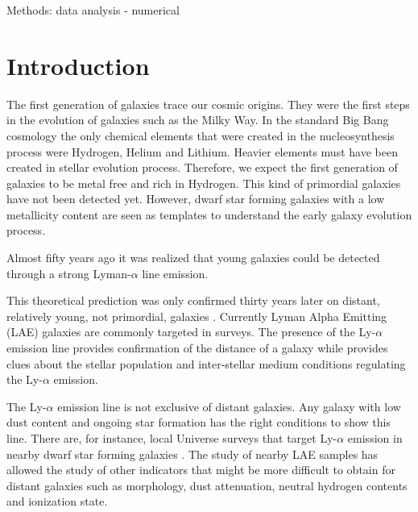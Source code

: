 \documentclass[a4,useAMS,usenatbib,usegraphicx]{mn2e}
\begin{document}
\begin{keywords}
Methods: data analysis - numerical 
\end{keywords}



\section{Introduction}
\label{sec:introduction}





The first generation of galaxies trace our cosmic origins. 
They were the first steps in the evolution of galaxies such as the Milky
Way. 
In the standard Big Bang cosmology the only chemical elements that
were created in the nucleosynthesis process were Hydrogen, Helium and
Lithium.  
Heavier elements must have been created in stellar evolution process. 
Therefore, we expect the first generation of
galaxies to be metal free and rich in Hydrogen. 
This kind of primordial galaxies have not been detected yet. 
However, dwarf star forming galaxies with a low metallicity content
are seen as templates to understand the early galaxy evolution process. 

Almost fifty years ago \citep{PartridgePeebles} it was realized that
young galaxies could be detected through a strong Lyman-$\alpha$ line
emission.  


This theoretical prediction was only confirmed thirty years later on
distant, relatively young, not primordial, galaxies \citep{1998ApJ...498L..93D}.
Currently Lyman Alpha Emitting (LAE) galaxies are commonly targeted
in surveys. 
The presence of the Ly-$\alpha$ emission line provides confirmation of
the distance of a galaxy while provides clues about the stellar
population and inter-stellar medium conditions regulating the
Ly-$\alpha$ emission. 

The Ly-$\alpha$ emission line is not exclusive of distant galaxies. 
Any galaxy with low dust content and ongoing star formation has the
right conditions to show this line.  
There are, for instance,  local Universe surveys that target
Ly-$\alpha$ emission in nearby dwarf star forming galaxies 
\citep{LARS}. 
The study of nearby LAE samples has allowed the study of other
indicators that might be more difficult to obtain for distant galaxies
such as morphology, dust attenuation, neutral hydrogen contents and
ionization state.  
\end{document}
